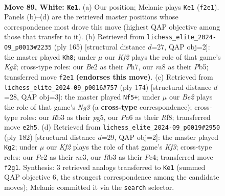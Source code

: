 \documentclass[11pt]{article}
\begin{document}
\clearpage

\begin{figure}[p]\centering
\begin{subfigure}{0.46\textwidth}\centering
\resizebox{\linewidth}{!}{%
\newchessgame
\chessboard[
  setfen={r7/n2k4/P7/8/8/1R4PP/2P1BK2/8 w - - 11 89},
  showmover=false,
  pgfstyle=straightmove, color=movearrow, markmove={f2-e1}
]}
\caption{}
\end{subfigure}\hfill
\begin{subfigure}{0.46\textwidth}\centering
\resizebox{\linewidth}{!}{%
\newchessgame
\chessboard[
  setfen={8/6kp/8/pp4p1/1b6/8/8/1K6 b - - 29 83},
  showmover=false,
  pgfstyle=straightmove, color=movearrow, markmove={g7-h8}
]}
\caption{}
\end{subfigure}
\\[4pt]
\begin{subfigure}{0.46\textwidth}\centering
\resizebox{\linewidth}{!}{%
\newchessgame
\chessboard[
  setfen={5R2/8/8/6p1/3k4/6NP/r2n2PK/8 w - - 74 88},
  showmover=false,
  pgfstyle=straightmove, color=movearrow, markmove={g3-f5}
]}
\caption{}
\end{subfigure}\hfill
\begin{subfigure}{0.46\textwidth}\centering
\resizebox{\linewidth}{!}{%
\newchessgame
\chessboard[
  setfen={8/4k1p1/8/5p1P/2P2P2/1nn1BK2/8/8 w - - 1 92},
  showmover=false,
  pgfstyle=straightmove, color=movearrow, markmove={f3-g2}
]}
\caption{}
\end{subfigure}
\caption{\textbf{Move 89, White: \texttt{Ke1}.} (a) Our position; Melanie plays \texttt{Ke1} (\texttt{f2e1}). Panels (b)--(d) are the retrieved master positions whose correspondence most drove this move (highest QAP objective among those that transfer to it). (b) Retrieved from \texttt{lichess\_elite\_2024-09\_p0013\#2235} (ply 165) [structural distance $d$=27, QAP obj=2]: the master played \texttt{Kh8}; under $\mu$ our \emph{Kf2} plays the role of that game's \emph{Kg2}; cross-type roles: our \emph{B}e2 as their \emph{P}h7, our \emph{r}a8 as their \emph{P}b5; transferred move \texttt{f2e1} \textbf{(endorses this move)}. (c) Retrieved from \texttt{lichess\_elite\_2024-09\_p0016\#757} (ply 174) [structural distance $d$=28, QAP obj=3]: the master played \texttt{Nf5+}; under $\mu$ our \emph{Be2} plays the role of that game's \emph{Ng3} (a \textbf{cross-type} correspondence); cross-type roles: our \emph{R}b3 as their \emph{p}g5, our \emph{P}a6 as their \emph{R}f8; transferred move \texttt{e2h5}. (d) Retrieved from \texttt{lichess\_elite\_2024-09\_p0019\#2950} (ply 182) [structural distance $d$=29, QAP obj=2]: the master played \texttt{Kg2}; under $\mu$ our \emph{Kf2} plays the role of that game's \emph{Kf3}; cross-type roles: our \emph{P}c2 as their \emph{n}c3, our \emph{R}b3 as their \emph{P}c4; transferred move \texttt{f2g1}. Synthesis: 3 retrieved analogs transferred to \texttt{Ke1} (summed QAP objective 6, the strongest correspondence among the candidate moves); Melanie committed it via the \texttt{search} selector.}
\label{fig:thought-m176}
\end{figure}
\end{document}
